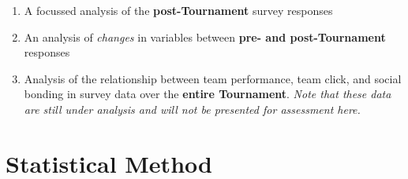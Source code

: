 \begin{enumerate}
  \item A focussed analysis of the \textbf{post-Tournament} survey responses
  \item An analysis of \textit{changes} in variables between \textbf{pre- and post-Tournament} responses
  \item Analysis of the relationship between team performance, team click, and social bonding in survey data over the \textbf{entire Tournament}. \textit{Note that these data are still under analysis and will not be presented for assessment here.}
\end{enumerate}














\section{\label{app5:stats}Statistical Method}

